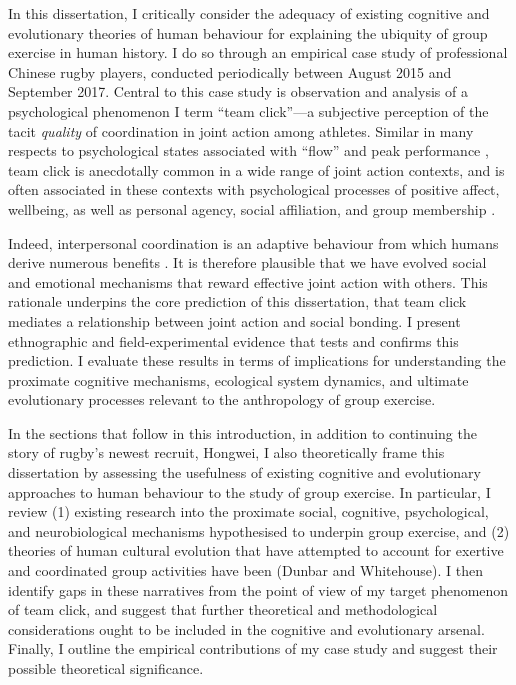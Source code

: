 In this dissertation, I critically consider the adequacy of existing cognitive and evolutionary theories of human behaviour for explaining the ubiquity of group exercise in human history.  I do so through an empirical case study of professional Chinese rugby players, conducted periodically between August 2015 and September 2017. Central to this case study is observation and analysis of a psychological phenomenon I term ``team click''---a subjective perception  of the tacit \textit{quality} of coordination in joint action among athletes.  Similar in many respects to psychological states associated with ``flow'' and peak performance \citep{Csikszentmihalyi1992}, team click is anecdotally common in a wide range of joint action contexts, and is often associated in these contexts with psychological processes of positive affect, wellbeing, as well as personal agency, social affiliation, and group membership \citep{Marsh2009, Wheatley2012}.

Indeed, interpersonal coordination is an adaptive behaviour from which humans derive numerous benefits \citep{Tomasello2014}. It is therefore plausible that we have evolved social and emotional mechanisms that reward effective joint action with others. This rationale underpins the core prediction of this dissertation, that team click mediates a relationship between joint action and social bonding.  I present ethnographic and field-experimental evidence that tests and confirms this prediction.  I evaluate these results in terms of implications for understanding the proximate cognitive mechanisms, ecological system dynamics, and ultimate evolutionary processes relevant to the anthropology of group exercise.

In the sections that follow in this introduction, in addition to continuing the story of rugby's newest recruit, Hongwei, I also theoretically frame this dissertation by assessing the usefulness of existing cognitive and evolutionary approaches to human behaviour to the study of group exercise. In particular, I review (1) existing research into the proximate social, cognitive, psychological, and neurobiological mechanisms hypothesised to underpin group exercise, and (2) theories of human cultural evolution that have attempted to account for exertive and coordinated group activities have been (Dunbar and Whitehouse).  I then identify gaps in these narratives from the point of view of my target phenomenon of team click, and suggest that further theoretical and methodological considerations ought to be included in the cognitive and evolutionary arsenal.  Finally, I outline the empirical contributions of my case study and suggest their possible theoretical significance.


